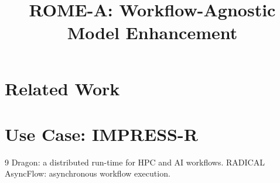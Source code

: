 \documentclass{article}
\title{ROME-A: Workflow-Agnostic Model Enhancement}
\date{}
\begin{document}
\maketitle

\section{Related Work}\label{sec:related}
\section{Use Case: IMPRESS-R}\label{sec:impressr}



\begin{thebibliography}{9}
 Dragon: a distributed run-time for HPC and AI workflows.
 RADICAL AsyncFlow: asynchronous workflow execution.
\end{thebibliography}
\end{document}
